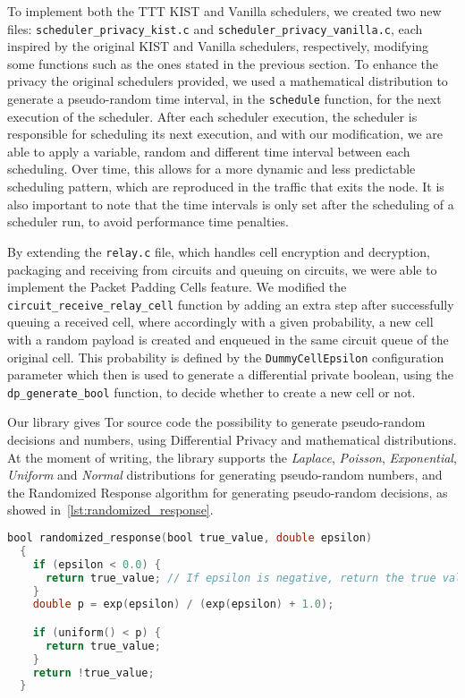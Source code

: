To implement both the TTT KIST and Vanilla schedulers, we created two new files: \texttt{scheduler\_privacy\_kist.c} and \texttt{scheduler\_privacy\_vanilla.c}, each inspired by the original KIST and Vanilla schedulers, respectively, modifying some functions such as the ones stated in the previous section. 
To enhance the privacy the original schedulers provided, we used a mathematical distribution to generate a pseudo-random time interval, in the \texttt{schedule} function, for the next execution of the scheduler. After each scheduler execution, the scheduler is responsible for scheduling its next execution, and with our modification, we are able to apply a variable, random and different time interval between each scheduling. Over time, this allows for a more dynamic and less predictable scheduling pattern, which are reproduced in the traffic that exits the node.
It is also important to note that the time intervals is only set after the scheduling of a scheduler run, to avoid performance time penalties.

By extending the \texttt{relay.c} file, which handles cell encryption and decryption, packaging and receiving from circuits and queuing on circuits, we were able to implement the Packet Padding Cells feature. We modified the \texttt{circuit\_receive\_relay\_cell} function by adding an extra step after successfully queuing a received cell, where accordingly with a given probability, a new cell with a random payload is created and enqueued in the same circuit queue of the original cell. This probability is defined by the \texttt{DummyCellEpsilon} configuration parameter which then is used to generate a differential private boolean, using the \texttt{dp\_generate\_bool} function, to decide whether to create a new cell or not.  

Our library gives Tor source code the possibility to  generate pseudo-random decisions and numbers, using Differential Privacy and mathematical distributions. At the moment of writing, the library supports the \textit{Laplace}, \textit{Poisson}, \textit{Exponential}, \textit{Uniform} and \textit{Normal} distributions for generating pseudo-random numbers, and the Randomized Response algorithm for generating pseudo-random decisions, as showed in~\autoref{lst:randomized_response}.
\begin{lstlisting}[language=C, caption={Randomized Response algorithm implementation.}, label={lst:randomized_response}]
  bool randomized_response(bool true_value, double epsilon)
  {
    if (epsilon < 0.0) {
      return true_value; // If epsilon is negative, return the true value
    }
    double p = exp(epsilon) / (exp(epsilon) + 1.0);

    if (uniform() < p) {
      return true_value;
    }
    return !true_value;
  }
\end{lstlisting}


